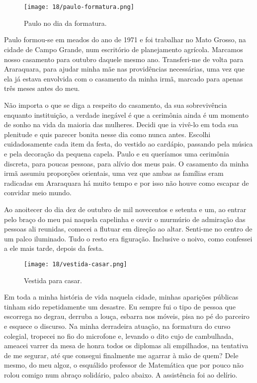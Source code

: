 \chapter{}

\begin{figure}
\centering
\texttt{[image: 18/paulo-formatura.png]}
\caption{Paulo no dia da formatura.}
\end{figure}

Paulo formou-se em meados do ano de 1971 e foi trabalhar no Mato Grosso, na cidade de Campo Grande, num escritório de planejamento agrícola.
Marcamos nosso casamento para outubro daquele mesmo ano.
Transferi-me de volta para Araraquara, para ajudar minha mãe nas providências necessárias, uma vez que ela já estava envolvida com o casamento da minha irmã, marcado para apenas três meses antes do meu.


Não importa o que se diga a respeito do casamento, da sua sobrevivência enquanto instituição, a verdade inegável é que a cerimônia ainda é um momento de sonho na vida da maioria das mulheres.
Decidi que ia vivê-lo em toda sua plenitude e quis parecer bonita nesse dia como nunca antes.
Escolhi cuidadosamente cada item da festa, do vestido ao cardápio, passando pela música e pela decoração da pequena capela.
Paulo e eu queríamos uma cerimônia discreta, para poucas pessoas, para alívio dos meus pais.
O casamento da minha irmã assumiu proporções orientais, uma vez que ambas as famílias eram radicadas em Araraquara há muito tempo e por isso não houve como escapar de convidar meio mundo.

Ao anoitecer do dia dez de outubro de mil novecentos e setenta e um, ao entrar pelo braço do meu pai naquela capelinha e ouvir o murmúrio de admiração das pessoas ali reunidas, comecei a flutuar em direção ao altar.
Senti-me no centro de um palco iluminado.
Tudo o resto era figuração.
Inclusive o noivo, como confessei a ele mais tarde, depois da festa.


\begin{figure}[H]
\centering
\texttt{[image: 18/vestida-casar.png]}
\caption{Vestida para casar.}
\end{figure}

Em toda a minha história de vida naquela cidade, minhas aparições públicas tinham sido repetidamente um desastre.
Eu sempre fui o tipo de pessoa que escorrega no degrau, derruba a louça, esbarra nos móveis, pisa no pé do parceiro e esquece o discurso.
Na minha derradeira atuação, na formatura do curso colegial, tropecei no fio do microfone e, levando o dito cujo de cambulhada, ameacei varrer da mesa de honra todos os diplomas ali empilhados, na tentativa de me segurar, até que consegui finalmente me agarrar à mão de quem?  Dele mesmo, do meu algoz, o esquálido professor de Matemática que por pouco não rolou comigo num abraço solidário, palco abaixo.
A assistência foi ao delírio.
 

